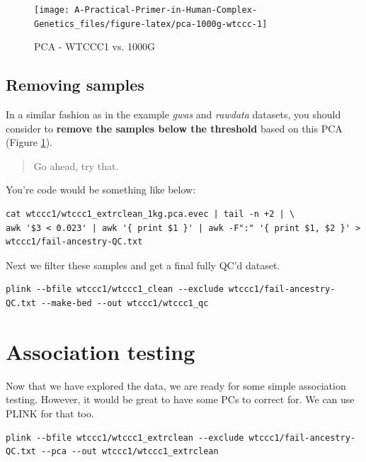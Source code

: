 \documentclass[
]{book}
\begin{document}
\begin{figure}

{\centering \texttt{[image: A-Practical-Primer-in-Human-Complex-Genetics\_files/figure-latex/pca-1000g-wtccc-1]} 

}

\caption{PCA - WTCCC1 vs. 1000G}\label{fig:pca-1000g-wtccc}
\end{figure}

\hypertarget{removing-samples-1}{%
\subsection{Removing samples}\label{removing-samples-1}}

In a similar fashion as in the example \emph{gwas} and \emph{rawdata} datasets, you should consider to \textbf{remove the samples below the threshold} based on this PCA (Figure \ref{fig:pca-1000g-wtccc}).

\begin{quote}
Go ahead, try that.
\end{quote}

You're code would be something like below:

\begin{verbatim}
cat wtccc1/wtccc1_extrclean_1kg.pca.evec | tail -n +2 | \
awk '$3 < 0.023' | awk '{ print $1 }' | awk -F":" '{ print $1, $2 }' > wtccc1/fail-ancestry-QC.txt
\end{verbatim}

Next we filter these samples and get a final fully QC'd dataset.

\begin{verbatim}
plink --bfile wtccc1/wtccc1_clean --exclude wtccc1/fail-ancestry-QC.txt --make-bed --out wtccc1/wtccc1_qc
\end{verbatim}

\hypertarget{association-testing}{%
\section{Association testing}\label{association-testing}}

Now that we have explored the data, we are ready for some simple association testing. However, it would be great to have some PCs to correct for. We can use PLINK for that too.

\begin{verbatim}
plink --bfile wtccc1/wtccc1_extrclean --exclude wtccc1/fail-ancestry-QC.txt --pca --out wtccc1/wtccc1_extrclean
\end{verbatim}
\end{document}
